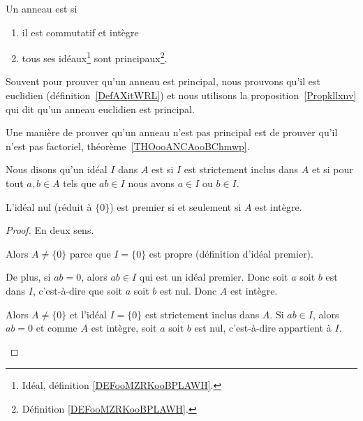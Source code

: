 \begin{definition}          \label{DEFooGWOZooXzUlhK}
	Un anneau est  si
	\begin{enumerate}
		\item
		      il est commutatif et intègre
		\item
		      tous ses idéaux\footnote{Idéal, définition \ref{DEFooMZRKooBPLAWH}.} sont principaux\footnote{Définition \ref{DEFooMZRKooBPLAWH}.}.
	\end{enumerate}
\end{definition}

Souvent pour prouver qu'un anneau est principal, nous prouvons qu'il est euclidien (définition~\ref{DefAXitWRL}) et nous utilisons la proposition~\ref{Propkllxnv} qui dit qu'un anneau euclidien est principal.

Une manière de prouver qu'un anneau n'est pas principal est de prouver qu'il n'est pas factoriel, théorème~\ref{THOooANCAooBChmwp}.

\begin{definition}      \label{DEFooAQSZooVhvQWv}
	Nous disons qu'un idéal \( I\) dans \( A\) est  si \( I\) est strictement inclus dans \( A\) et si pour tout \( a,b\in A\) tels que \( ab\in I\) nous avons \( a\in I\) ou \( b\in I\).
\end{definition}

\begin{lemma}       \label{LEMooYRPBooYxXXsi}
	L'idéal nul (réduit à \( \{ 0 \}\)) est premier si et seulement si \( A\) est intègre.
\end{lemma}

\begin{proof}
	En deux sens.
	\begin{subproof}
		Alors \( A\neq \{ 0 \}\) parce que \( I=\{ 0 \}\) est propre (définition d'idéal premier).

		De plus, si \( ab=0\), alors \( ab\in I\) qui est un idéal premier. Donc soit \( a\) soit \( b\) est dans \( I\), c'est-à-dire que soit \( a\) soit \( b\) est nul. Donc \( A\) est intègre.

		Alors \( A\neq \{ 0 \}\) et l'idéal \( I=\{ 0 \}\) est strictement inclus dans \( A\). Si \( ab\in I\), alors \( ab=0\) et comme \( A\) est intègre, soit \( a\) soit \( b\) est nul, c'est-à-dire appartient à \( I\).
	\end{subproof}
\end{proof}

